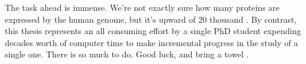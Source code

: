The task ahead is immense. We're not exactly sure how many proteins are expressed by the human genome, but it's upward of 20 thousand \cite{salzberg2018}. By contrast, this thesis represents an all consuming effort by a single PhD student expending decades worth of computer time to make incremental progress in the study of a single one. There is so much to do. Good luck, and bring a towel \cite{adams1979}. 
